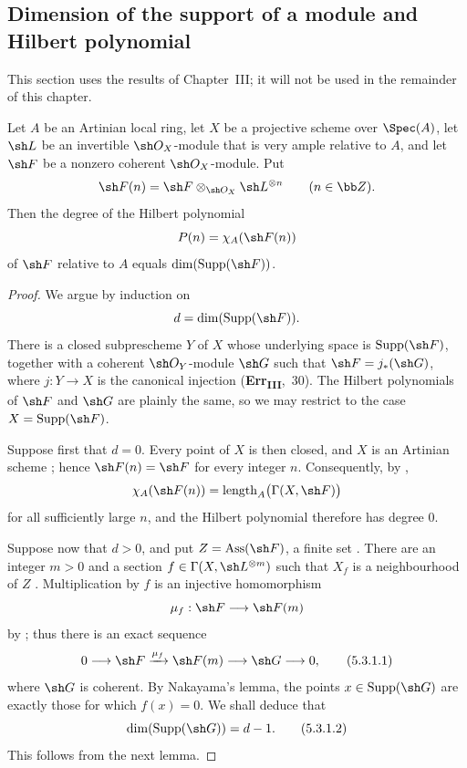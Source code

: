 \subsection{Dimension of the support of a module and Hilbert polynomial}
\label{subsection:IV.5.3}


This section uses the results of Chapter~III; it will not be used in
the remainder of this chapter.

\begin{proposition}[5.3.1]
\label{IV.5.3.1}
Let $A$ be an Artinian local ring, let $X$ be a projective scheme over
$\Spec(A)$, let $\sh L$ be an invertible $\sh O_X$-module that is very
ample relative to $A$, and let $\sh F$ be a nonzero coherent
$\sh O_X$-module. Put
\[
\sh F(n)=\sh F\otimes_{\sh O_X}\sh L^{\otimes n}
\qquad(n\in\bb Z).
\]
Then the degree of the Hilbert polynomial
\[
P(n)=\chi_A(\sh F(n))
\]
of $\sh F$ relative to $A$  equals
$\dim(\operatorname{Supp}(\sh F))$.
\end{proposition}

\begin{proof}
We argue by induction on
\[
d=\dim(\operatorname{Supp}(\sh F)).
\]
There is a closed subprescheme $Y$ of $X$ whose underlying space is
$\operatorname{Supp}(\sh F)$, together with a coherent
$\sh O_Y$-module $\sh G$ such that $\sh F=j_*(\sh G)$, where
$j:Y\to X$ is the canonical injection
(\textbf{Err}\textsubscript{\textbf{III}},~30).
The Hilbert polynomials of $\sh F$ and $\sh G$ are plainly the same,
so we may restrict to the case
$X=\operatorname{Supp}(\sh F)$.

Suppose first that $d=0$.
Every point of $X$ is then closed, and $X$ is an Artinian scheme
; hence $\sh F(n)=\sh F$ for every integer $n$.
Consequently, by ,
\[
\chi_A(\sh F(n))
  =\operatorname{length}_A\bigl(\Gamma(X,\sh F)\bigr)
\]
for all sufficiently large $n$, and the Hilbert polynomial therefore
has degree $0$.

Suppose now that $d>0$, and put
$Z=\operatorname{Ass}(\sh F)$, a finite set .
There are an integer $m>0$ and a section
$f\in\Gamma(X,\sh L^{\otimes m})$ such that $X_f$ is a neighbourhood
of $Z$ .
Multiplication by $f$ is an injective homomorphism
\[
\mu_f:\sh F\longrightarrow\sh F(m)
\]
by ; thus there is an exact sequence
\begin{equation}
0\longrightarrow\sh F
 \xrightarrow{\mu_f}\sh F(m)
 \longrightarrow\sh G
 \longrightarrow0,
\tag{5.3.1.1}\label{IV.5.3.1.1}
\end{equation}
where $\sh G$ is coherent.
By Nakayama's lemma, the points
$x\in\operatorname{Supp}(\sh G)$ are exactly those for which
$f(x)=0$.
We shall deduce that
\begin{equation}
\dim(\operatorname{Supp}(\sh G))=d-1.
\tag{5.3.1.2}\label{IV.5.3.1.2}
\end{equation}
This follows from the next lemma.
\end{proof}

